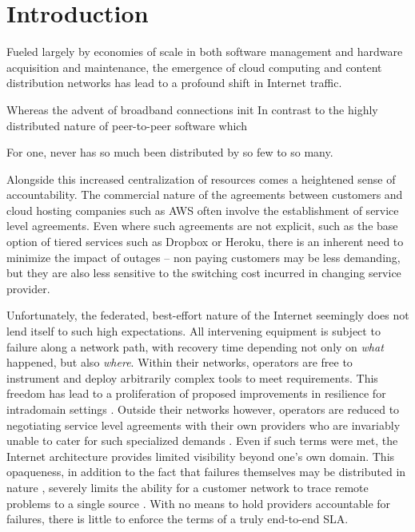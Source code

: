 \section{Introduction}

Fueled largely by economies of scale in both software management and hardware acquisition and maintenance, the emergence of cloud computing and content distribution networks has lead to a profound shift in Internet traffic.


Whereas the advent of broadband connections init
In contrast to the highly distributed nature of peer-to-peer software which 

For one, never has so much been distributed by so few to so many.

Alongside this increased centralization of resources comes a heightened sense of accountability.
The commercial nature of the agreements between customers and cloud hosting companies such as AWS \cite{} often involve the establishment of service level agreements.
Even where such agreements are not explicit, such as the base option of tiered services such as Dropbox or Heroku, there is an inherent need to minimize the impact of outages -- non paying customers may be less demanding, but they are also less sensitive to the switching cost incurred in changing service provider.

Unfortunately, the federated, best-effort nature of the Internet seemingly does not lend itself to such high expectations.
All intervening equipment is subject to failure along a network path, with recovery time depending not only on \emph{what} happened, but also \emph{where}.
Within their networks, operators are free to instrument and deploy arbitrarily complex tools to meet requirements. 
This freedom has lead to a proliferation of proposed improvements in resilience for intradomain settings \cite{}.
Outside their networks however, operators are reduced to negotiating service level agreements with their own providers who are invariably unable to cater for such specialized demands \cite{}.
Even if such terms were met, the Internet architecture provides limited visibility beyond one's own domain.
This opaqueness, in addition to the fact that failures themselves may be distributed in nature \cite{}, severely limits the ability for a customer network to trace remote problems to a single source \cite{}.
With no means to hold providers accountable for failures, there is little to enforce the terms of a truly end-to-end SLA.

